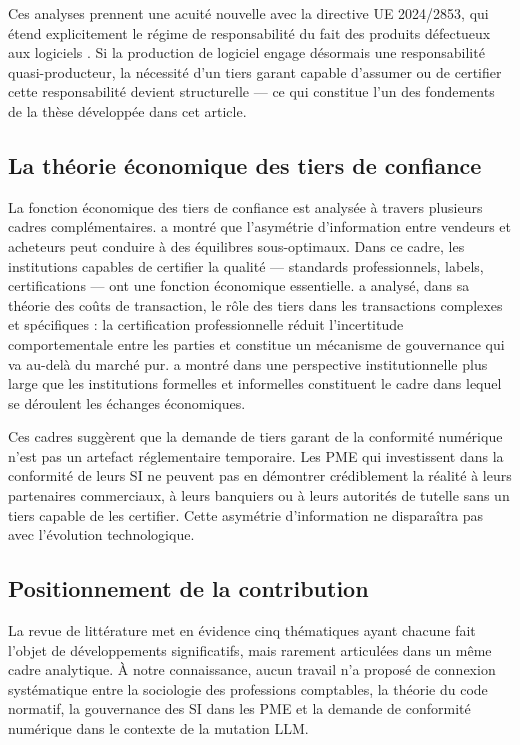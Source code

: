 \documentclass[12pt,a4paper]{article}
\begin{document}
Ces analyses prennent une acuité nouvelle avec la directive UE 2024/2853, qui étend explicitement le régime de responsabilité du fait des produits défectueux aux logiciels \parencite{directive20242853}. Si la production de logiciel engage désormais une responsabilité quasi-producteur, la nécessité d'un tiers garant capable d'assumer ou de certifier cette responsabilité devient structurelle — ce qui constitue l'un des fondements de la thèse développée dans cet article.

\subsection{La théorie économique des tiers de confiance}

La fonction économique des tiers de confiance est analysée à travers plusieurs cadres complémentaires. \textcite{akerlof1970} a montré que l'asymétrie d'information entre vendeurs et acheteurs peut conduire à des équilibres sous-optimaux. Dans ce cadre, les institutions capables de certifier la qualité — standards professionnels, labels, certifications — ont une fonction économique essentielle. \textcite{williamson1985} a analysé, dans sa théorie des coûts de transaction, le rôle des tiers dans les transactions complexes et spécifiques : la certification professionnelle réduit l'incertitude comportementale entre les parties et constitue un mécanisme de gouvernance qui va au-delà du marché pur. \textcite{north1990} a montré dans une perspective institutionnelle plus large que les institutions formelles et informelles constituent le cadre dans lequel se déroulent les échanges économiques.

Ces cadres suggèrent que la demande de tiers garant de la conformité numérique n'est pas un artefact réglementaire temporaire. Les PME qui investissent dans la conformité de leurs SI ne peuvent pas en démontrer crédiblement la réalité à leurs partenaires commerciaux, à leurs banquiers ou à leurs autorités de tutelle sans un tiers capable de les certifier. Cette asymétrie d'information ne disparaîtra pas avec l'évolution technologique.

\subsection{Positionnement de la contribution}

La revue de littérature met en évidence cinq thématiques ayant chacune fait l'objet de développements significatifs, mais rarement articulées dans un même cadre analytique. À notre connaissance, aucun travail n'a proposé de connexion systématique entre la sociologie des professions comptables, la théorie du code normatif, la gouvernance des SI dans les PME et la demande de conformité numérique dans le contexte de la mutation LLM.
\end{document}
